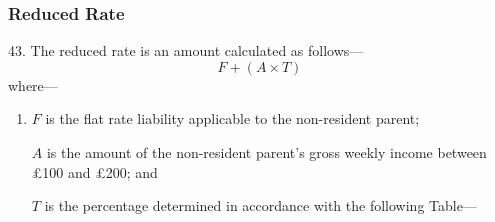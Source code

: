 \documentclass[12pt,a4paper]{article}
\begin{document}
\renewcommand\parthead{--- Part IV Chapter II}

\subsubsection[43. Reduced Rate]{Reduced Rate}

43.  The reduced rate is an amount calculated as follows—
\[
F + (A \times T)
\]
\pagebreak[4]
where—
\begin{enumerate}\item[]
    $F$ is the flat rate liability applicable to the non-resident parent;

    $A$ is the amount of the non-resident parent’s gross weekly income between £100 and £200; and

    $T$ is the percentage determined in accordance with the following Table— 
\end{enumerate}

\end{document}
